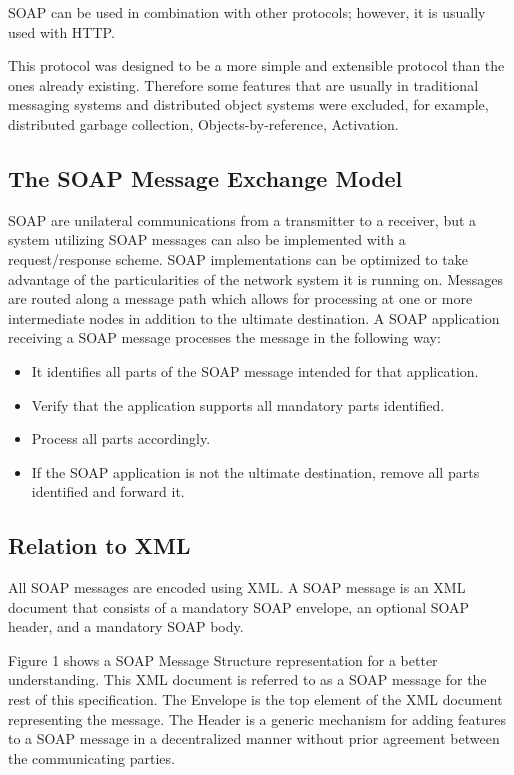 \documentclass[conference]{IEEEtran}
\begin{document}
SOAP can be used in combination with other protocols; however, it is usually used with HTTP.

This protocol was designed to be a more simple and extensible protocol than the ones already existing. Therefore some features that are usually in traditional messaging systems and distributed object systems were excluded, for example, distributed garbage collection, Objects-by-reference, Activation.

\subsection{The SOAP Message Exchange Model}

SOAP are unilateral communications from a transmitter to a receiver, but a system utilizing SOAP messages can also be implemented with a request/response scheme.
SOAP implementations can be optimized to take advantage of the particularities of the network system it is running on.
Messages are routed along a message path which allows for processing at one or more intermediate nodes in addition to the ultimate destination.
A SOAP application receiving a SOAP message processes the message in the following way:

\begin{itemize}
  \item It identifies all parts of the SOAP message intended for that application.
  \item Verify that the application supports all mandatory parts identified.
  \item Process all parts accordingly.
  \item If the SOAP application is not the ultimate destination, remove all parts identified and forward it.
\end{itemize}

\subsection{Relation to XML}

All SOAP messages are encoded using XML. A SOAP message is an XML document that consists of a mandatory SOAP envelope, an optional SOAP header, and a mandatory SOAP body. 

Figure 1 shows a SOAP Message Structure representation for a better understanding. This XML document is referred to as a SOAP message for the rest of this specification. The Envelope is the top element of the XML document representing the message. The Header is a generic mechanism for adding features to a SOAP message in a decentralized manner without prior agreement between the communicating parties. 
\end{document}
